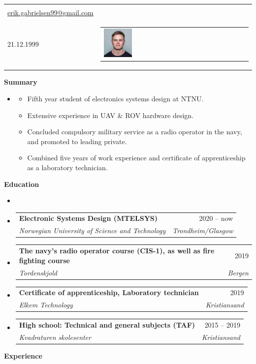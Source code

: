 \documentclass[letterpaper,12pt]{article}[leftmargin=*]
\makeatletter
\def \fullname {Erik Gabrielsen}
\def \subtitle {}
\def \linkedinicon {\faLinkedin}
\def \linkedinlink {http://www.linkedin.com/in/erik-gabrielsen-4505a6218}
\def \phoneicon {\faPhone}
\def \phonetext {+47 960 45 058}
\def \emailicon {\faEnvelope}
\def \emaillink {mailto:erik.gabrielsen99@gmail.com}
\def \emailtext {erik.gabrielsen99@gmail.com}
\def \githubicon {\faGithub}
\def \githublink {https://github.com/dwight-schrute}
\def \githubtext {/dwight-schrute}
\def \websiteicon {\faGlobe}
\def \websitelink {https://google.com/}
\def \websitetext {dwightschrute.com}
\def \locationicon {\faMapMarker}
\def \locationtext {Neufelds gate 6, 7030 Trondheim}
\def \headertype {\headerphoto} %
\def \entryspacing {-0pt}
\def \linkedin {\href{\linkedinlink}{\linkedinicon}}
\def \phone {\phoneicon \hspace{3pt}{ \phonetext}}
\def \email {\emailicon \hspace{3pt}\href{\emaillink}{\emailtext}}
\def \github {\githubicon \hspace{3pt}\href{\githublink}{\githubtext}}
\def \website {\websiteicon \hspace{3pt}\href{\websitelink}{\websitetext}}
\def \location {\locationicon \hspace{3pt}{\locationtext} }
\renewcommand{\section}[2]{\vspace{5pt}
  \colorbox{secondary}{\color{white}\raggedbottom\normalsize\textbf{{#1}{\hspace{7pt}#2}}}
}
\newcommand{\resumeEntryStart}{\begin{itemize}[leftmargin=2.5mm]\item[]}
\newcommand{\resumeEntryEnd}{\end{itemize}\vspace{\entryspacing}}
\newcommand{\resumeItemListStart}{\begin{itemize}[leftmargin=4.5mm]}
\newcommand{\resumeItemListEnd}{\end{itemize}}
\newcommand{\resumeItem}[1]{
  \item\small{
    {#1 \vspace{-2pt}}
  }
}
\newcommand{\resumeEntryTSDL}[4]{
  \vspace{-1pt}\item[]
    \begin{tabularx}{0.97\textwidth}{X@{\hspace{60pt}}r}
      \textbf{\color{primary}#1} & {\firabook\color{accent}\small#2} \\
      \textit{\color{accent}\small#3} & \textit{\color{accent}\small#4} \\
    \end{tabularx}\vspace{-6pt}
}
\newcommand{\doublecol}[6]{
  \begin{tabularx}{\textwidth}{Xr}
    {
      \begin{tabular}[c]{l}
        \fontsize{35}{45}\selectfont{\color{primary}{{\textbf{\fullname}}}} \\
        {\textit{\subtitle}} %
      \end{tabular}
    } & {
      \begin{tabular}[c]{l@{\hspace{1.5em}}l}
        {\small#4} & {\small#1} \\
        {\small#5} & {\small#2} \\
        {\small#6} & {\small#3}
      \end{tabular}
    }
  \end{tabularx}
}
\newcommand{\singlecol}[6]{
  \begin{tabularx}{\textwidth}{Xr}
    {
      \begin{tabular}[b]{l}
        \fontsize{35}{45}\selectfont{\color{primary}{{\textbf{\fullname}}}} \\
        {\textit{\subtitle}} %
      \end{tabular}
    } & {
      \begin{tabular}[c]{l}
        {\small#1} \\
        {\small#2} \\
        {\small#3} \\
        {\small#4} \\
        {\small#5} \\
        {\small#6}
      \end{tabular}
    }
  \end{tabularx}
}
\newcommand{\headerphoto}[6]{
\begin{tabularx}{\textwidth}{Xr}
    {
      \begin{tabular}[b]{l}
        \fontsize{35}{45}\selectfont{\color{primary}{{\textbf{\fullname}}}} \\
        {\small#4 \quad \small#5} \\
        {\small \faBirthdayCake \hspace{3pt}21.12.1999 \quad \small \location \quad \linkedin}
      \end{tabular}
    } & {
      \begin{tabular}{l}
        \includegraphics[width = 0.20\textwidth]{Erikg.jpg}
      \end{tabular}
    }
  \end{tabularx}
}
\makeatother
\begin{document}

\headertype{\linkedin}{\github}{\website}{\phone}{\email}{} %
\vspace{-50pt} %

\section{\faSendO}{Summary}

\resumeEntryStart
    \resumeItemListStart
      \resumeItem{Fifth year student of electronics systems design at NTNU.}
      \resumeItem{Extensive experience in UAV \& ROV hardware design.}
      \resumeItem{Concluded compulsory military service as a radio operator in the navy, and promoted to leading private.}
      \resumeItem{Combined five years of work experience and certificate of apprenticeship as a laboratory technician.}
    \resumeItemListEnd
\resumeEntryEnd

\section{\faGraduationCap}{Education}
\vspace{-10pt}
  \resumeEntryStart
    \resumeEntryTSDL
      {Electronic Systems Design \normalfont(MTELSYS)}{2020 -- now}
      {Norwegian University of Science and Technology}{Trondheim/Glasgow}
    
    \resumeEntryTSDL
    {The navy's radio operator course {\normalfont(CIS-1), as well as} fire fighting course}{2019}
    {Tordenskjold}{Bergen}
     
    \resumeEntryTSDL
    {Certificate of apprenticeship, Laboratory technician}{2019}
    {Elkem Technology}{Kristiansand}
    
    \resumeEntryTSDL
    {High school: Technical and general subjects \normalfont(TAF)}{2015 -- 2019}
    {Kvadraturen skolesenter}{Kristiansand}
  \resumeEntryEnd

\section{\faSuitcase}{Experience}
\vspace{-10pt}
\end{document}
